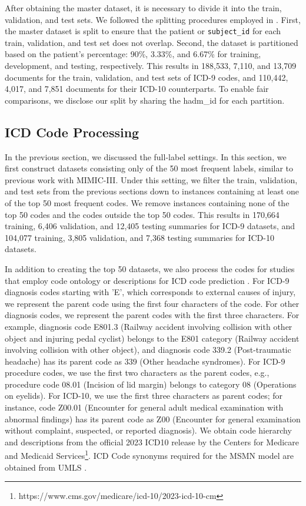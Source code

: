 \documentclass[11pt]{article}
\begin{document}
After obtaining the master dataset, it is necessary to divide it into the train, validation, and test sets. We followed the splitting procedures employed in \cite{mullenbach-etal-2018-explainable}. First, the master dataset is split to ensure that the patient or \texttt{subject\_id} for each train, validation, and test set does not overlap. Second, the dataset is partitioned based on the patient's percentage: 90\%, 3.33\%, and 6.67\% for training, development, and testing, respectively. This results in 188,533, 7,110, and 13,709 documents for the train, validation, and test sets of ICD-9 codes, and 110,442, 4,017, and 7,851 documents for their ICD-10 counterparts. To enable fair comparisons, we disclose our split by sharing the hadm\_id for each partition. 

\subsection{ICD Code Processing}

In the previous section, we discussed the full-label settings. In this section, we first construct datasets consisting only of the 50 most frequent labels, similar to previous work with MIMIC-III. Under this setting, we filter the train, validation, and test sets from the previous sections down to instances containing at least one of the top 50 most frequent codes. We remove instances containing none of the top 50 codes and the codes outside the top 50 codes. This results in 170,664 training, 6,406 validation, and 12,405 testing summaries for ICD-9 datasets, and 104,077 training, 3,805 validation, and 7,368 testing summaries for ICD-10 datasets.

In addition to creating the top 50 datasets, we also process the codes for studies that employ code ontology \citep{ijcai2020-461-vu} or descriptions for ICD code prediction \citep{yuan-etal-2022-code}. For ICD-9 diagnosis codes starting with 'E', which corresponds to external causes of injury, we represent the parent code using the first four characters of the code. For other diagnosis codes, we represent the parent codes with the first three characters. For example, diagnosis code E801.3 (Railway accident involving collision with other object and injuring pedal cyclist) belongs to the E801 category (Railway accident involving collision with other object), and diagnosis code 339.2 (Post-traumatic headache) has its parent code as 339 (Other headache syndromes). For ICD-9 procedure codes, we use the first two characters as the parent codes, e.g., procedure code 08.01 (Incision of lid margin) belongs to category 08 (Operations on eyelids). For ICD-10, we use the first three characters as parent codes; for instance, code Z00.01 (Encounter for general adult medical examination with abnormal findings) has its parent code as Z00 (Encounter for general examination without complaint, suspected, or reported diagnosis). We obtain code hierarchy and descriptions from the official 2023 ICD10 release by the Centers for Medicare and Medicaid Services\footnote{https://www.cms.gov/medicare/icd-10/2023-icd-10-cm}. ICD Code synonyms required for the MSMN model \cite{yuan-etal-2022-code} are obtained from UMLS \cite{umls2004}.
\end{document}
